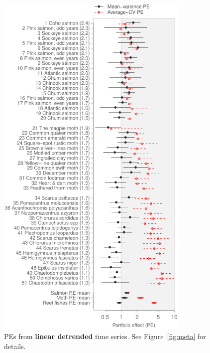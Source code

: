 \begin{figure}[htbp]
  \centering
  \includegraphics[height=6.8in]{prophets/PE_comparison_z_meta_detrend_taxa_20121214.pdf}
  \caption[PEs from linear detrended time series.]{PEs from \textbf{linear detrended} time series. See
    Figure~\ref{fig:meta} for details.
}
\label{fig:meta-detrend}
\end{figure}

